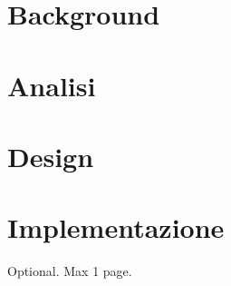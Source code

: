 \documentclass[12pt,a4paper,openright,twoside]{book}
\begin{document}
\chapter{Background}
\label{chap:background}


\chapter{Analisi}
\label{chap:analisi}

\chapter{Design}
\label{chap:design}

\chapter{Implementazione}
\label{chap:implementazione}


\backmatter

\nocite{*} %




\begin{acknowledgements} %
    Optional. Max 1 page.
\end{acknowledgements}
\end{document}
